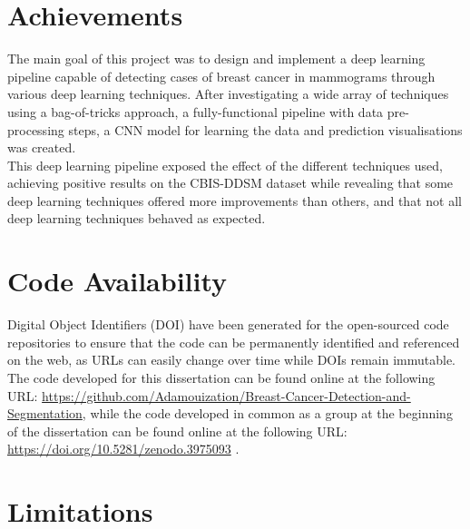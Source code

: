 \section{Achievements}

The main goal of this project was to design and implement a deep learning pipeline capable of detecting cases of breast cancer in mammograms through various deep learning techniques. After investigating a wide array of techniques using a bag-of-tricks approach, a fully-functional pipeline with data pre-processing steps, a CNN model for learning the data and prediction visualisations was created.\\

This deep learning pipeline exposed the effect of the different techniques used, achieving  positive results on the CBIS-DDSM dataset while revealing that some deep learning techniques offered more improvements than others, and that not all deep learning techniques behaved as expected.


\section{Code Availability}

Digital Object Identifiers (DOI) have been generated for the open-sourced code repositories to ensure that the code can be permanently identified and referenced on the web, as URLs can easily change over time while DOIs remain immutable.\\

The code developed for this dissertation can be found online at the following URL: \url{https://github.com/Adamouization/Breast-Cancer-Detection-and-Segmentation}, while the code developed in common as a group at the beginning of the dissertation can be found online at the following URL: \url{https://doi.org/10.5281/zenodo.3975093} \citep{adam_jaamour_2020_3975093}.


\section{Limitations}
\label{sec:conclusions-limitations}

